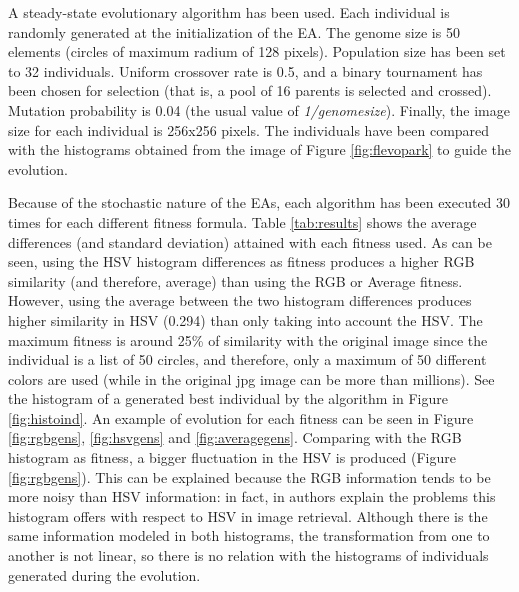 A steady-state evolutionary algorithm has been used. %
Each individual is randomly generated at the initialization of the EA. The genome size is 50 elements (circles of maximum radium of 128 pixels). Population size has been set to 32 individuals. Uniform crossover rate is 0.5, and a binary tournament has been chosen for selection (that is, a pool of 16 parents is selected and crossed). Mutation probability is 0.04 (the usual value of {\em 1/genomesize}). Finally, the image size for each individual is 256x256 pixels. The individuals have been compared with the histograms obtained from the image of Figure \ref{fig:flevopark} to guide the evolution. 

 Because of the stochastic nature of the EAs, each algorithm
has been executed 30 times for each different fitness formula. Table
\ref{tab:results} shows the average differences (and standard
deviation) attained with each fitness used. As can be seen, using the
HSV histogram differences as fitness produces a higher RGB similarity
(and therefore, average) than using the RGB or Average
fitness. However, using the average between the two histogram
differences produces higher similarity in HSV (0.294) than only taking
into account the HSV. The maximum fitness is around 25\% of similarity
with the original image since the individual is a list of 50 circles,
and therefore, only a maximum of 50 different colors are used (while
in the original jpg image can be more than millions). See the
histogram of a generated best individual by the algorithm in Figure
\ref{fig:histoind}. An example of evolution for each fitness can be
seen in Figure \ref{fig:rgbgens}, \ref{fig:hsvgens} and
\ref{fig:averagegens}. Comparing with the RGB histogram as fitness, a
bigger fluctuation in the HSV is produced (Figure
\ref{fig:rgbgens}). This can be explained because the RGB information
tends to be more noisy than HSV information: in fact, in
\cite{COLORDIFFERENCES} authors explain the problems this histogram
offers with respect to HSV in image retrieval. Although there is the
same information modeled in both histograms, the transformation from
one to another is not linear, so there is no relation with the
histograms of individuals generated during the evolution. 

